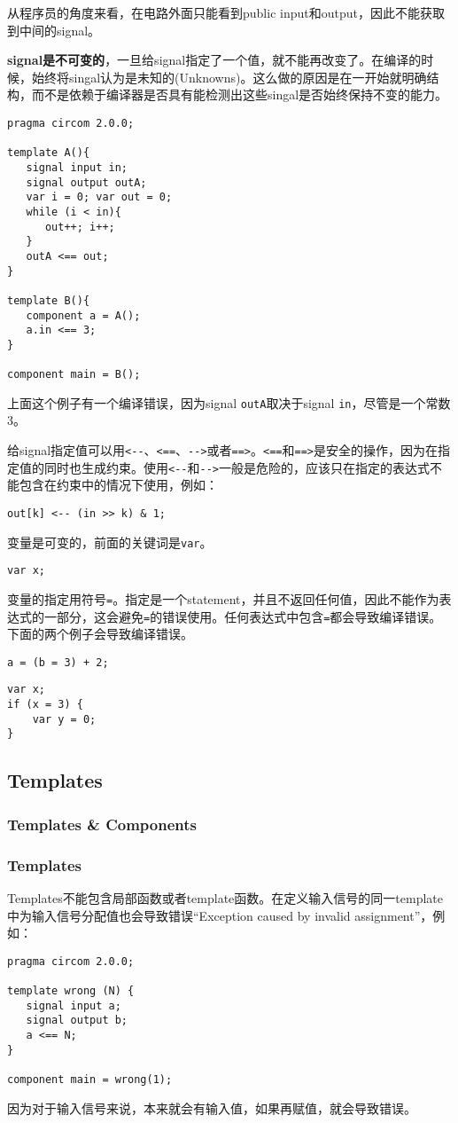 \documentclass[10pt]{ctexart}
\begin{document}
从程序员的角度来看，在电路外面只能看到public input和output，因此不能获取到中间的signal。

\textbf{signal是不可变的}，一旦给signal指定了一个值，就不能再改变了。在编译的时候，始终将singal认为是未知的(Unknowns)。这么做的原因是在一开始就明确结构，而不是依赖于编译器是否具有能检测出这些singal是否始终保持不变的能力。
\begin{lstlisting}
pragma circom 2.0.0;

template A(){
   signal input in;
   signal output outA; 
   var i = 0; var out = 0;
   while (i < in){
      out++; i++;
   }
   outA <== out;
}

template B(){
   component a = A();
   a.in <== 3;
}

component main = B();
\end{lstlisting}
上面这个例子有一个编译错误，因为signal \verb|outA|取决于signal \verb|in|，尽管是一个常数3。

给signal指定值可以用\verb|<--|、\verb|<==|、\verb|-->|或者\verb|==>|。\verb|<==|和\verb|==>|是安全的操作，因为在指定值的同时也生成约束。使用\verb|<--|和\verb|-->|一般是危险的，应该只在指定的表达式不能包含在约束中的情况下使用，例如：
\begin{lstlisting}
out[k] <-- (in >> k) & 1;
\end{lstlisting}

变量是可变的，前面的关键词是\verb|var|。
\begin{lstlisting}
var x;
\end{lstlisting}
变量的指定用符号\verb|=|。指定是一个statement，并且不返回任何值，因此不能作为表达式的一部分，这会避免\verb|=|的错误使用。任何表达式中包含\verb|=|都会导致编译错误。下面的两个例子会导致编译错误。

\begin{lstlisting}
a = (b = 3) + 2;
\end{lstlisting}
\begin{lstlisting}
var x;
if (x = 3) {
	var y = 0;
}
\end{lstlisting}

\subsection{Templates}
\subsubsection{Templates \& Components}
\subsubsection*{Templates}
Templates不能包含局部函数或者template函数。在定义输入信号的同一template中为输入信号分配值也会导致错误“Exception caused by invalid assignment”，例如：
\begin{lstlisting}
pragma circom 2.0.0;

template wrong (N) {
   signal input a;
   signal output b;
   a <== N;
}

component main = wrong(1);	
\end{lstlisting}
因为对于输入信号来说，本来就会有输入值，如果再赋值，就会导致错误。
\end{document}
